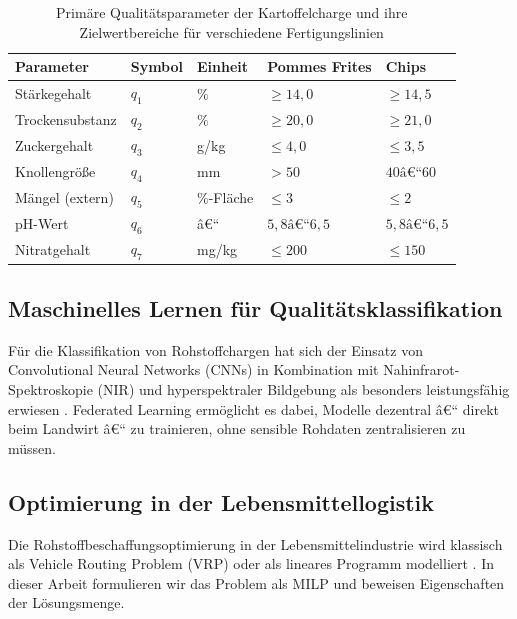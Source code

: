 ﻿\documentclass[12pt,a4paper]{article}
\theoremstyle{plain}
\theoremstyle{definition}
\begin{document}
	\begin{table}[H]
		\centering
		\caption{Primäre Qualitätsparameter der Kartoffelcharge und ihre
			Zielwertbereiche für verschiedene Fertigungslinien}
		\label{tab:qualitaetsparameter}
		\begin{tabular}{@{}lllll@{}}
			\toprule
			\textbf{Parameter} & \textbf{Symbol} & \textbf{Einheit} &
			\textbf{Pommes Frites} & \textbf{Chips} \\
			\midrule
			Stärkegehalt        & $q_1$ & $\%$       & $\geq 14{,}0$ & $\geq 14{,}5$ \\
			Trockensubstanz     & $q_2$ & $\%$       & $\geq 20{,}0$ & $\geq 21{,}0$ \\
			Zuckergehalt        & $q_3$ & g/kg       & $\leq 4{,}0$  & $\leq 3{,}5$ \\
			Knollengröße        & $q_4$ & mm         & $> 50$        & $40\text{â€“}60$ \\
			Mängel (extern)     & $q_5$ & $\%$-Fläche& $\leq 3$      & $\leq 2$ \\
			pH-Wert             & $q_6$ & â€“          & $5{,}8\text{â€“}6{,}5$ & $5{,}8\text{â€“}6{,}5$ \\
			Nitratgehalt        & $q_7$ & mg/kg      & $\leq 200$    & $\leq 150$ \\
			\bottomrule
		\end{tabular}
	\end{table}
	
	\subsection{Maschinelles Lernen für Qualitätsklassifikation}
	
	Für die Klassifikation von Rohstoffchargen hat sich der Einsatz von
	Convolutional Neural Networks (CNNs) in Kombination mit Nahinfrarot-Spektroskopie
	(NIR) und hyperspektraler Bildgebung als besonders leistungsfähig erwiesen
	\cite{elmasry2012,su2017,lu2020}. Federated Learning \cite{mcmahan2017}
	ermöglicht es dabei, Modelle dezentral â€“ direkt beim Landwirt â€“ zu trainieren,
	ohne sensible Rohdaten zentralisieren zu müssen.
	
	\subsection{Optimierung in der Lebensmittellogistik}
	
	Die Rohstoffbeschaffungsoptimierung in der Lebensmittelindustrie wird
	klassisch als Vehicle Routing Problem (VRP) oder als lineares Programm
	modelliert \cite{ahumada2009,shukla2019}. In dieser Arbeit formulieren
	wir das Problem als MILP und beweisen Eigenschaften der Lösungsmenge.
	
\end{document}
